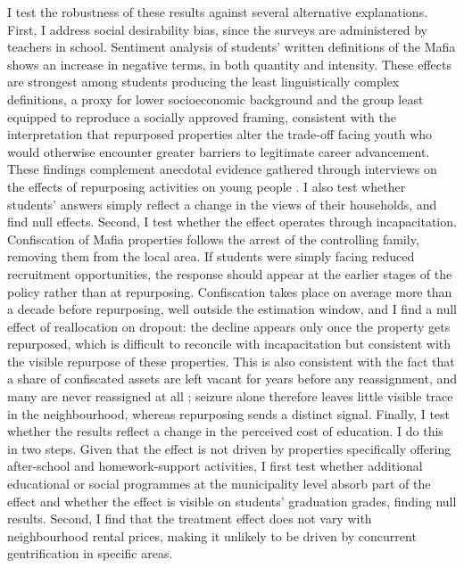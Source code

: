 \documentclass[12pt]{article}
\theoremstyle{plain}
\theoremstyle{plain}
\theoremstyle{plain}
\theoremstyle{definition}
\theoremstyle{plain}
\theoremstyle{definition}
\theoremstyle{plain}
\theoremstyle{remark}
\theoremstyle{definition}
\theoremstyle{definition}
\theoremstyle{plain}
\begin{document}
I test the robustness of these results against several alternative explanations. First, I address social desirability bias, since the surveys are administered by teachers in school. Sentiment analysis of students' written definitions of the Mafia shows an increase in negative terms, in both quantity and intensity. These effects are strongest among students producing the least linguistically complex definitions, a proxy for lower socioeconomic background and the group least equipped to reproduce a socially approved framing, consistent with the interpretation that repurposed properties alter the trade-off facing youth who would otherwise encounter greater barriers to legitimate career advancement. These findings complement anecdotal evidence gathered through interviews on the effects of repurposing activities on young people \citep{nazzaro_il_2021, falcone_beneitalia_2016}. I also test whether students' answers simply reflect a change in the views of their households, and find null effects. Second, I test whether the effect operates through incapacitation. Confiscation of Mafia properties follows the arrest of the controlling family, removing them from the local area. If students were simply facing reduced recruitment opportunities, the response should appear at the earlier stages of the policy rather than at repurposing. Confiscation takes place on average more than a decade before repurposing, well outside the estimation window, and I find a null effect of reallocation on dropout: the decline appears only once the property gets repurposed, which is difficult to reconcile with incapacitation but consistent with the visible repurpose of these properties. This is also consistent with the fact that a share of confiscated assets are left vacant for years before any reassignment, and many are never reassigned at all \citep{falcone_beneitalia_2016}; seizure alone therefore leaves little visible trace in the neighbourhood, whereas repurposing sends a distinct signal.
Finally, I test whether the results reflect a change in the perceived cost of education. I do this in two steps. Given that the effect is not driven by properties specifically offering after-school and homework-support activities, I first test whether additional educational or social programmes at the municipality level absorb part of the effect and whether the effect is visible on students' graduation grades, finding null results. Second, I find that the treatment effect does not vary with neighbourhood rental prices, making it unlikely to be driven by concurrent gentrification in specific areas. \par
\end{document}

